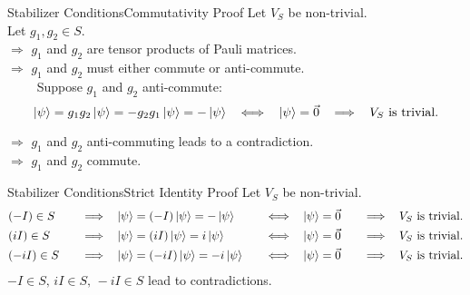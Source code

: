 \begin{frame}{Stabilizer Conditions}{Commutativity Proof}
    \vspace*{-3mm}
    Let \(V_S\) be non-trivial. \\

    \vspace*{2mm}
    Let \(g_1,g_2\in S\). \\

    \vspace*{2mm}
    \(\Longrightarrow\)
    \(g_1\) and \(g_2\) are tensor products of Pauli matrices. \\

    \vspace*{2mm}
    \(\Longrightarrow\)
    \(g_1\) and \(g_2\) must either commute or anti-commute. \\

    \vspace*{2mm}
    \(\qquad\)
    Suppose \(g_1\) and \(g_2\) anti-commute:
    \[
        \ket{\psi}
        =g_1g_2\ket{\psi}
        =-g_2g_1\ket{\psi}
        =-\ket{\psi}
        \operatorname{\quad\Longleftrightarrow\quad}
        \ket{\psi}=\Vec{0}
        \operatorname{\quad\Longrightarrow\quad}
        V_S\text{ is trivial.}
    \]

    \vspace*{2mm}
    \(\Longrightarrow\)
    \(g_1\) and \(g_2\) anti-commuting leads to a contradiction. \\

    \vspace*{2mm}
    \(\Longrightarrow\)
    \(g_1\) and \(g_2\) commute.

    \vspace*{5mm}
\end{frame}

\begin{frame}{Stabilizer Conditions}{Strict Identity Proof}
    Let \(V_S\) be non-trivial. \\
    \[
        \begin{aligned}
            &(-I)\in S
            &&\operatorname{\quad\Longrightarrow\quad}
            \ket{\psi}
            =(-I)\ket{\psi}
            =-\ket{\psi}
            &&\operatorname{\quad\Longleftrightarrow\quad}
            \ket{\psi}=\Vec{0}
            &&\operatorname{\quad\Longrightarrow\quad}
            V_S\text{ is trivial.} \\
            &(iI)\in S
            &&\operatorname{\quad\Longrightarrow\quad}
            \ket{\psi}
            =(iI)\ket{\psi}
            =i\ket{\psi}
            &&\operatorname{\quad\Longleftrightarrow\quad}
            \ket{\psi}=\Vec{0}
            &&\operatorname{\quad\Longrightarrow\quad}
            V_S\text{ is trivial.} \\
            &(-iI)\in S
            &&\operatorname{\quad\Longrightarrow\quad}
            \ket{\psi}
            =(-iI)\ket{\psi}
            =-i\ket{\psi}
            &&\operatorname{\quad\Longleftrightarrow\quad}
            \ket{\psi}=\Vec{0}
            &&\operatorname{\quad\Longrightarrow\quad}
            V_S\text{ is trivial.}
        \end{aligned}
    \]
    \(-I\in S,\,iI\in S,\,-iI\in S\)
    lead to contradictions.

    \vspace*{20mm}

\end{frame}